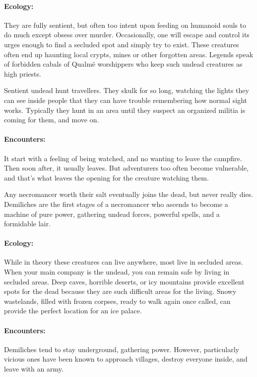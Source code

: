 \begin{multicols}{2}

\paragraph{Ecology:} They are fully sentient, but often too intent upon feeding on humanoid souls to do much except obsess over murder.
Occasionally, one will escape and control its urges enough to find a secluded spot and simply try to exist.
These creatures often end up haunting local crypts, mines or other forgotten areas.
Legends speak of forbidden cabals of Qualm\"{e} worshippers who keep such undead creatures as high priests.

Sentient undead hunt travellers.  They skulk for so long, watching the lights they can see inside people that they can have trouble remembering how normal sight works.  Typically they hunt in an area until they suspect an organized militia is coming for them, and move on.

\paragraph{Encounters:}  It start with a feeling of being watched, and no wanting to leave the campfire.  Then soon after, it usually leaves.  But adventurers too often become vulnerable, and that's what leaves the opening for the creature watching them.

\label{demilich}

Any necromancer worth their salt eventually joins the dead, but never really dies.  Demiliches are the first stages of a necromancer who ascends to become a machine of pure power, gathering undead forces, powerful spells, and a formidable lair.

\paragraph{Ecology:} While in theory these creatures can live anywhere, most live in secluded areas.  When your main company is the undead, you can remain safe by living in secluded areas.  Deep caves, horrible deserts, or icy mountains provide excellent spots for the dead because they are such difficult areas for the living.  Snowy wastelands, filled with frozen corpses, ready to walk again once called, can provide the perfect location for an ice palace.

\paragraph{Encounters:} Demiliches tend to stay underground, gathering power.
However, particularly vicious ones have been known to approach villages, destroy everyone inside, and leave with an army.

\demilich

\end{multicols}


